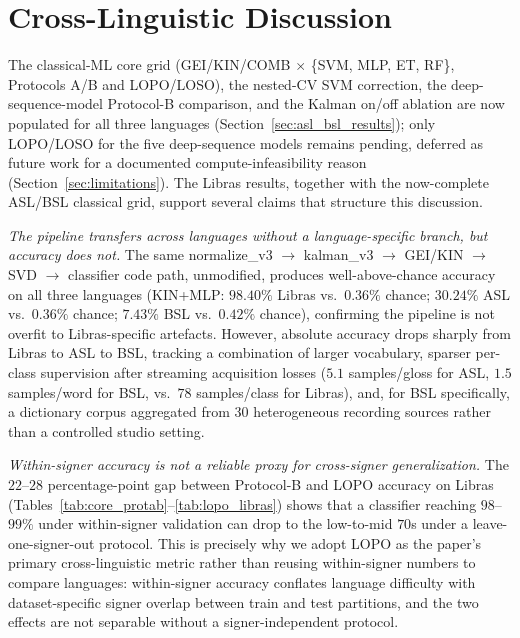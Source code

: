 \documentclass[journal]{IEEEtran}
\begin{document}
\section{Cross-Linguistic Discussion}
\label{sec:discussion}

The classical-ML core grid (GEI/KIN/COMB $\times$ \{SVM, MLP, ET, RF\}, Protocols A/B and LOPO/LOSO), the nested-CV SVM correction, the deep-sequence-model Protocol-B comparison, and the Kalman on/off ablation are now populated for all three languages (Section~\ref{sec:asl_bsl_results}); only LOPO/LOSO for the five deep-sequence models remains pending, deferred as future work for a documented compute-infeasibility reason (Section~\ref{sec:limitations}). The Libras results, together with the now-complete ASL/BSL classical grid, support several claims that structure this discussion.

\emph{The pipeline transfers across languages without a language-specific branch, but accuracy does not.} The same normalize\_v3 $\to$ kalman\_v3 $\to$ GEI/KIN $\to$ SVD $\to$ classifier code path, unmodified, produces well-above-chance accuracy on all three languages (KIN+MLP: $98.40\%$ Libras vs.\ $0.36\%$ chance; $30.24\%$ ASL vs.\ $0.36\%$ chance; $7.43\%$ BSL vs.\ $0.42\%$ chance), confirming the pipeline is not overfit to Libras-specific artefacts. However, absolute accuracy drops sharply from Libras to ASL to BSL, tracking a combination of larger vocabulary, sparser per-class supervision after streaming acquisition losses ($5.1$ samples/gloss for ASL, $1.5$ samples/word for BSL, vs.\ $78$ samples/class for Libras), and, for BSL specifically, a dictionary corpus aggregated from $30$ heterogeneous recording sources rather than a controlled studio setting.

\emph{Within-signer accuracy is not a reliable proxy for cross-signer generalization.} The $22$--$28$ percentage-point gap between Protocol-B and LOPO accuracy on Libras (Tables~\ref{tab:core_protab}--\ref{tab:lopo_libras}) shows that a classifier reaching $98$--$99\%$ under within-signer validation can drop to the low-to-mid $70$s under a leave-one-signer-out protocol. This is precisely why we adopt LOPO as the paper's primary cross-linguistic metric rather than reusing within-signer numbers to compare languages: within-signer accuracy conflates language difficulty with dataset-specific signer overlap between train and test partitions, and the two effects are not separable without a signer-independent protocol.
\end{document}
